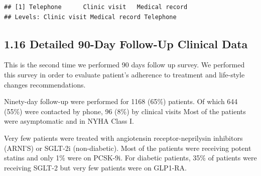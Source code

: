 \documentclass[
]{article}
\begin{document}
\begin{verbatim}
## [1] Telephone      Clinic visit   Medical record
## Levels: Clinic visit Medical record Telephone
\end{verbatim}

\pagebreak

\subsection{1.16 Detailed 90-Day Follow-Up Clinical
Data}\label{detailed-90-day-follow-up-clinical-data}

This is the second time we performed 90 days follow up survey. We
performed this survey in order to evaluate patient's adherence to
treatment and life-style changes recommendations.

Ninety-day follow-up were performed for 1168 (65\%) patients. Of which
644 (55\%) were contacted by phone, 96 (8\%) by clinical visits Most of
the patients were asymptomatic and in NYHA Class I.

Very few patients were treated with angiotensin receptor-neprilysin
inhibitors (ARNI'S) or SGLT-2i (non-diabetic). Most of the patients were
receiving potent statins and only 1\% were on PCSK-9i. For diabetic
patients, 35\% of patients were receiving SGLT-2 but very few patients
were on GLP1-RA.

~
\end{document}
